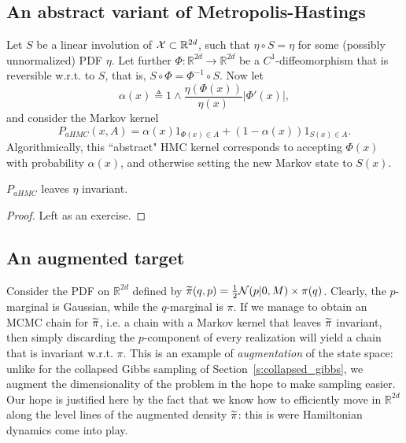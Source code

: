 \subsection{An abstract variant of Metropolis-Hastings}
\label{s:abstract_HMC}
Let $S$ be a linear involution of $\mathcal{X}\subset\mathbb{R}^{2d}$, such that $\eta\circ S = \eta$ for some (possibly unnormalized) PDF $\eta$.
Let further $\Phi:\mathbb{R}^{2d}\rightarrow \mathbb{R}^{2d}$ be a $C^1$-diffeomorphism that is reversible w.r.t. to $S$, that is, $S\circ \Phi = \Phi^{-1}\circ S$.
Now let 
\begin{equation}
    \label{e:acceptance_probability_abstract_HMC}
    \alpha(x) \triangleq 1\wedge \frac{\eta(\Phi(x))}{\eta(x)} \vert\Phi'(x)\vert,
\end{equation}
and consider the Markov kernel
$$
P_{aHMC}(x,A) = \alpha(x) 1_{\Phi(x)\in A} + (1-\alpha(x))1_{S(x)\in A}.
$$
Algorithmically, this ``abstract" HMC kernel corresponds to accepting $\Phi(x)$ with probability $\alpha(x)$, and otherwise setting the new Markov state to $S(x)$.
\begin{proposition}
\label{p:invariance_abstract_HMC}
$P_{aHMC}$ leaves $\eta$ invariant.
\end{proposition}
\begin{proof}
    Left as an exercise.
\end{proof}

\subsection{An augmented target}
Consider the PDF on $\mathbb{R}^{2d}$ defined by $\widetilde{\pi}(q,p) = \frac12 \mathcal{N}(p\vert 0, M) \times \pi(q)$. 
Clearly, the $p$-marginal is Gaussian, while the $q$-marginal is $\pi$. 
If we manage to obtain an MCMC chain for $\widetilde{\pi}$, i.e. a chain with a Markov kernel that leaves $\widetilde{\pi}$ invariant, then simply discarding the $p$-component of every realization will yield a chain that is invariant w.r.t. $\pi$. 
This is an example of \emph{augmentation} of the state space: unlike for the collapsed Gibbs sampling of Section~\ref{s:collapsed_gibbs}, we augment the dimensionality of the problem in the hope to make sampling easier. 
Our hope is justified here by the fact that we know how to efficiently move in $\mathbb{R}^{2d}$ along the level lines of the augmented density $\widetilde{\pi}$: this is were Hamiltonian dynamics come into play.

